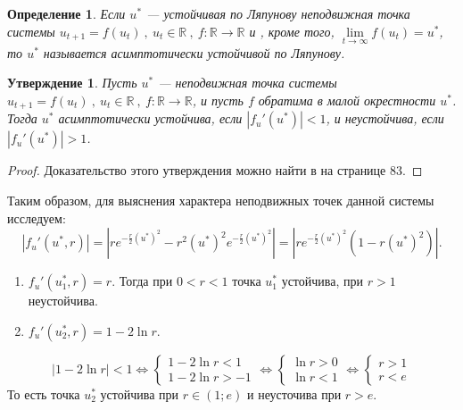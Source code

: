 \documentclass[10pt]{article}
\newtheorem{definition}{Определение}
\newtheorem{statement}{Утверждение}
\numberwithin{equation}{section}
\begin{document}
\begin{definition}
	Если \( u^* \) --- устойчивая по Ляпунову неподвижная точка системы \( u_{t+1} = f(u_t) \ , \ u_t \in \mathbb{R} \ , \ f : \mathbb{R} \to \mathbb{R} \)
и , кроме того, \( \lim\limits_{t \to \infty} f(u_t) = u^* \), то \( u^* \) называется асимптотически устойчивой по Ляпунову.
\end{definition}

\begin{statement}
	Пусть \( u^* \) --- неподвижная точка системы \( u_{t+1} = f(u_t) \ , \ u_t \in \mathbb{R} \ , \ f : \mathbb{R} \to \mathbb{R} \), и пусть \( f \) обратима в малой окрестности \( u^* \). Тогда \( u^* \) асимптотически устойчива, если \( |f_u'(u^*)| < 1 \), и неустойчива, если \( |f_u'(u^*)| > 1 \).
\end{statement} 
\begin{proof}
	Доказательство этого утверждения можно найти в \cite{1} на странице 83.
\end{proof}

\noindent Таким образом, для выяснения характера неподвижных точек данной системы исследуем:
\[ |f_u'(u^*, r)|  = |re^{-\frac{r}{2}(u^*)^2} - r^2(u^*)^2 e^{-\frac{r}{2}(u^*)^2}| = |re^{-\frac{r}{2}(u^*)^2}(1 - r(u^*)^2) |. \] 

\begin{enumerate}
	\item \( f_u'(u_1^*, r) = r \). Тогда при \( 0 < r < 1 \) точка \( u_1^* \) устойчива, при \( r > 1 \) неустойчива.
	\item \( f_u'(u_2^*, r) = 1 - 2\ln{r} \).
\end{enumerate}
	\[ |1 - 2\ln{r}| < 1 \iff \begin{cases} 1 - 2 \ln{r} < 1 \\ 1 - 2 \ln{r} > -1 \end{cases}  \iff \begin{cases} \ln{r} > 0 \\ \ln{r} < 1 \end{cases} \iff  \begin{cases} r > 1 \\ r < e \end{cases}\]
\noindent То есть точка \( u_2^* \) устойчива при \( r \in (1; e) \) и неусточива при \( r > e \).
\end{document}
